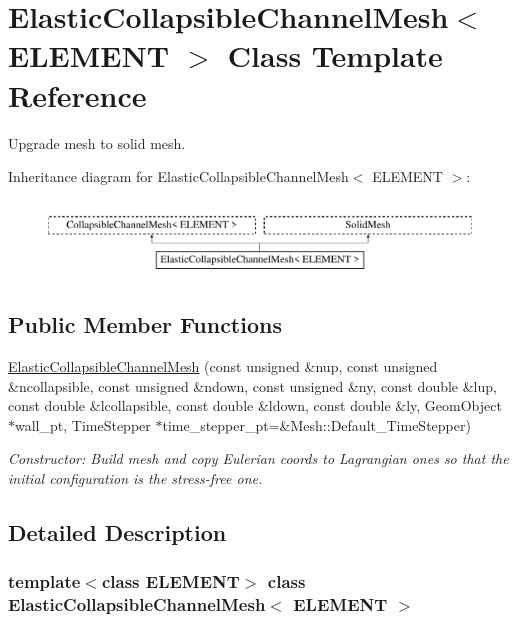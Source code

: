 \hypertarget{classElasticCollapsibleChannelMesh}{}\section{Elastic\+Collapsible\+Channel\+Mesh$<$ E\+L\+E\+M\+E\+NT $>$ Class Template Reference}
\label{classElasticCollapsibleChannelMesh}


Upgrade mesh to solid mesh.  


Inheritance diagram for Elastic\+Collapsible\+Channel\+Mesh$<$ E\+L\+E\+M\+E\+NT $>$\+:\begin{figure}[H]
\begin{center}
\leavevmode
\includegraphics[height=2.000000cm]{classElasticCollapsibleChannelMesh}
\end{center}
\end{figure}
\subsection*{Public Member Functions}
\begin{DoxyCompactItemize}
\item 
\hyperlink{classElasticCollapsibleChannelMesh_aa8a158f7f3d3e40dc29bdaa756546771}{Elastic\+Collapsible\+Channel\+Mesh} (const unsigned \&nup, const unsigned \&ncollapsible, const unsigned \&ndown, const unsigned \&ny, const double \&lup, const double \&lcollapsible, const double \&ldown, const double \&ly, Geom\+Object $\ast$wall\+\_\+pt, Time\+Stepper $\ast$time\+\_\+stepper\+\_\+pt=\&Mesh\+::\+Default\+\_\+\+Time\+Stepper)
\begin{DoxyCompactList}\small\item\em Constructor\+: Build mesh and copy Eulerian coords to Lagrangian ones so that the initial configuration is the stress-\/free one. \end{DoxyCompactList}\end{DoxyCompactItemize}


\subsection{Detailed Description}
\subsubsection*{template$<$class E\+L\+E\+M\+E\+NT$>$\newline
class Elastic\+Collapsible\+Channel\+Mesh$<$ E\+L\+E\+M\+E\+N\+T $>$}

